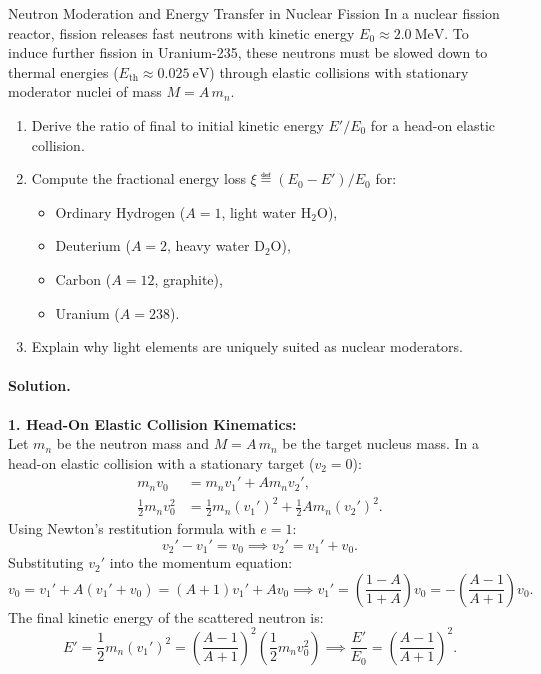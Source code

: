 \begin{workedexample}{Neutron Moderation and Energy Transfer in Nuclear Fission}
In a nuclear fission reactor, fission releases fast neutrons with kinetic energy $E_0 \approx 2.0\ \mathrm{MeV}$. To induce further fission in Uranium-235, these neutrons must be slowed down to thermal energies ($E_{\text{th}} \approx 0.025\ \mathrm{eV}$) through elastic collisions with stationary moderator nuclei of mass $M = A\,m_n$.
\begin{enumerate}[leftmargin=1.4em,itemsep=3pt]
  \item Derive the ratio of final to initial kinetic energy $E'/E_0$ for a head-on elastic collision.
  \item Compute the fractional energy loss $\xi \eqdef (E_0 - E')/E_0$ for:
  \begin{itemize}[leftmargin=1.2em]
    \item Ordinary Hydrogen ($A = 1$, light water $\mathrm{H_2O}$),
    \item Deuterium ($A = 2$, heavy water $\mathrm{D_2O}$),
    \item Carbon ($A = 12$, graphite),
    \item Uranium ($A = 238$).
  \end{itemize}
  \item Explain why light elements are uniquely suited as nuclear moderators.
\end{enumerate}

\paragraph{Solution.}
\textbf{1. Head-On Elastic Collision Kinematics:}\\
Let $m_n$ be the neutron mass and $M = A\,m_n$ be the target nucleus mass. In a head-on elastic collision with a stationary target ($v_2 = 0$):
\begin{align*}
m_n v_0 &= m_n v_1' + A m_n v_2', \\
\frac{1}{2}m_n v_0^2 &= \frac{1}{2}m_n (v_1')^2 + \frac{1}{2}A m_n (v_2')^2.
\end{align*}
Using Newton's restitution formula with $e = 1$:
\[
v_2' - v_1' = v_0 \implies v_2' = v_1' + v_0.
\]
Substituting $v_2'$ into the momentum equation:
\[
v_0 = v_1' + A(v_1' + v_0) = (A + 1)v_1' + A v_0 \implies v_1' = \left(\frac{1 - A}{1 + A}\right) v_0 = -\left(\frac{A - 1}{A + 1}\right) v_0.
\]
The final kinetic energy of the scattered neutron is:
\[
E' = \frac{1}{2}m_n (v_1')^2 = \left(\frac{A - 1}{A + 1}\right)^2 \left(\frac{1}{2}m_n v_0^2\right) \implies \frac{E'}{E_0} = \left(\frac{A - 1}{A + 1}\right)^2.
\]


\end{workedexample}
